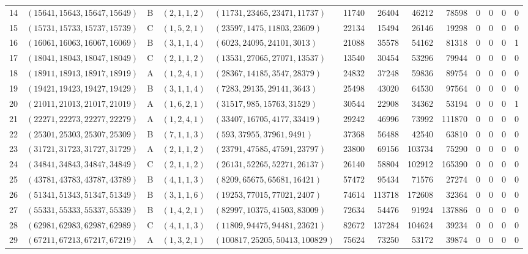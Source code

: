 \begin{longtable}{r l c l l r r r r c c c c}
14 & $(15641,15643,15647,15649)$ & B & $(2,1,1,2)$ & $(11731,23465,23471,11737)$ & 11740 & 26404 & 46212 & 78598 & 0 & 0 & 0 & 0\\
15 & $(15731,15733,15737,15739)$ & C & $(1,5,2,1)$ & $(23597,1475,11803,23609)$ & 22134 & 15494 & 26146 & 19298 & 0 & 0 & 0 & 0\\
16 & $(16061,16063,16067,16069)$ & B & $(3,1,1,4)$ & $(6023,24095,24101,3013)$ & 21088 & 35578 & 54162 & 81318 & 0 & 0 & 0 & 1\\
17 & $(18041,18043,18047,18049)$ & C & $(2,1,1,2)$ & $(13531,27065,27071,13537)$ & 13540 & 30454 & 53296 & 79944 & 0 & 0 & 0 & 0\\
18 & $(18911,18913,18917,18919)$ & A & $(1,2,4,1)$ & $(28367,14185,3547,28379)$ & 24832 & 37248 & 59836 & 89754 & 0 & 0 & 0 & 0\\
19 & $(19421,19423,19427,19429)$ & B & $(3,1,1,4)$ & $(7283,29135,29141,3643)$ & 25498 & 43020 & 64530 & 97564 & 0 & 0 & 0 & 0\\
20 & $(21011,21013,21017,21019)$ & A & $(1,6,2,1)$ & $(31517,985,15763,31529)$ & 30544 & 22908 & 34362 & 53194 & 0 & 0 & 0 & 1\\
21 & $(22271,22273,22277,22279)$ & A & $(1,2,4,1)$ & $(33407,16705,4177,33419)$ & 29242 & 46996 & 73992 & 111870 & 0 & 0 & 0 & 0\\
22 & $(25301,25303,25307,25309)$ & B & $(7,1,1,3)$ & $(593,37955,37961,9491)$ & 37368 & 56488 & 42540 & 63810 & 0 & 0 & 0 & 0\\
23 & $(31721,31723,31727,31729)$ & A & $(2,1,1,2)$ & $(23791,47585,47591,23797)$ & 23800 & 69156 & 103734 & 75290 & 0 & 0 & 0 & 0\\
24 & $(34841,34843,34847,34849)$ & C & $(2,1,1,2)$ & $(26131,52265,52271,26137)$ & 26140 & 58804 & 102912 & 165390 & 0 & 0 & 0 & 0\\
25 & $(43781,43783,43787,43789)$ & B & $(4,1,1,3)$ & $(8209,65675,65681,16421)$ & 57472 & 95434 & 71576 & 27274 & 0 & 0 & 0 & 0\\
26 & $(51341,51343,51347,51349)$ & B & $(3,1,1,6)$ & $(19253,77015,77021,2407)$ & 74614 & 113718 & 172608 & 32364 & 0 & 0 & 0 & 0\\
27 & $(55331,55333,55337,55339)$ & B & $(1,4,2,1)$ & $(82997,10375,41503,83009)$ & 72634 & 54476 & 91924 & 137886 & 0 & 0 & 0 & 0\\
28 & $(62981,62983,62987,62989)$ & C & $(4,1,1,3)$ & $(11809,94475,94481,23621)$ & 82672 & 137284 & 104624 & 39234 & 0 & 0 & 0 & 0\\
29 & $(67211,67213,67217,67219)$ & A & $(1,3,2,1)$ & $(100817,25205,50413,100829)$ & 75624 & 73250 & 53172 & 39874 & 0 & 0 & 0 & 0\\

\end{longtable}
